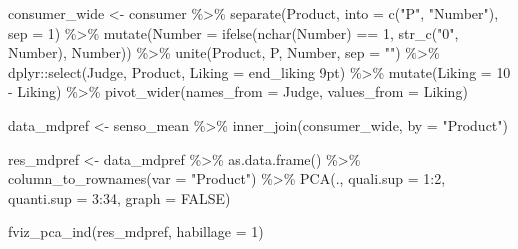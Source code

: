 \documentclass[
]{krantz}
\makeatletter
\newenvironment{Shaded}{\begin{snugshade}}{\end{snugshade}}
\newcommand{\AttributeTok}[1]{\textcolor[rgb]{0.61,0.61,0.61}{#1}}
\newcommand{\ConstantTok}[1]{\textcolor[rgb]{0,0,0}{#1}}
\newcommand{\DecValTok}[1]{\textcolor[rgb]{0.06,0.06,0.06}{#1}}
\newcommand{\FunctionTok}[1]{\textcolor[rgb]{0,0,0}{#1}}
\newcommand{\NormalTok}[1]{#1}
\newcommand{\OtherTok}[1]{\textcolor[rgb]{0.37,0.37,0.37}{#1}}
\newcommand{\SpecialCharTok}[1]{\textcolor[rgb]{0,0,0}{#1}}
\newcommand{\StringTok}[1]{\textcolor[rgb]{0.5,0.5,0.5}{#1}}
\newenvironment{kframe}{%
\medskip{}
\setlength{\fboxsep}{.8em}
 \def\at@end@of@kframe{}%
 \ifinner\ifhmode%
  \def\at@end@of@kframe{\end{minipage}}%
  \begin{minipage}{\columnwidth}%
 \fi\fi%
 \def\FrameCommand##1{\hskip\@totalleftmargin \hskip-\fboxsep
 \colorbox{shadecolor}{##1}\hskip-\fboxsep
     \hskip-\linewidth \hskip-\@totalleftmargin \hskip\columnwidth}%
 \MakeFramed {\advance\hsize-\width
   \@totalleftmargin\z@ \linewidth\hsize
   \@setminipage}}%
 {\par\unskip\endMakeFramed%
 \at@end@of@kframe}
\renewenvironment{Shaded}{\begin{kframe}}{\end{kframe}}
\makeatother
\begin{document}
\begin{Shaded}
\begin{Highlighting}[]
\NormalTok{consumer\_wide }\OtherTok{\textless{}{-}}\NormalTok{ consumer }\SpecialCharTok{\%\textgreater{}\%}
  \FunctionTok{separate}\NormalTok{(Product, }\AttributeTok{into =} \FunctionTok{c}\NormalTok{(}\StringTok{"P"}\NormalTok{, }\StringTok{"Number"}\NormalTok{), }\AttributeTok{sep =} \DecValTok{1}\NormalTok{) }\SpecialCharTok{\%\textgreater{}\%}
  \FunctionTok{mutate}\NormalTok{(}\AttributeTok{Number =} \FunctionTok{ifelse}\NormalTok{(}\FunctionTok{nchar}\NormalTok{(Number) }\SpecialCharTok{==} \DecValTok{1}\NormalTok{, }
                         \FunctionTok{str\_c}\NormalTok{(}\StringTok{"0"}\NormalTok{, Number), Number)) }\SpecialCharTok{\%\textgreater{}\%}
  \FunctionTok{unite}\NormalTok{(Product, P, Number, }\AttributeTok{sep =} \StringTok{""}\NormalTok{) }\SpecialCharTok{\%\textgreater{}\%}
\NormalTok{  dplyr}\SpecialCharTok{::}\FunctionTok{select}\NormalTok{(Judge, Product, }\AttributeTok{Liking =} \StringTok{\textasciigrave{}}\AttributeTok{end\_liking 9pt}\StringTok{\textasciigrave{}}\NormalTok{) }\SpecialCharTok{\%\textgreater{}\%}
  \FunctionTok{mutate}\NormalTok{(}\AttributeTok{Liking =} \DecValTok{10} \SpecialCharTok{{-}}\NormalTok{ Liking) }\SpecialCharTok{\%\textgreater{}\%}
  \FunctionTok{pivot\_wider}\NormalTok{(}\AttributeTok{names\_from =}\NormalTok{ Judge, }\AttributeTok{values\_from =}\NormalTok{ Liking)}

\NormalTok{data\_mdpref }\OtherTok{\textless{}{-}}\NormalTok{ senso\_mean }\SpecialCharTok{\%\textgreater{}\%}
  \FunctionTok{inner\_join}\NormalTok{(consumer\_wide, }\AttributeTok{by =} \StringTok{"Product"}\NormalTok{)}

\NormalTok{res\_mdpref }\OtherTok{\textless{}{-}}\NormalTok{ data\_mdpref }\SpecialCharTok{\%\textgreater{}\%}
  \FunctionTok{as.data.frame}\NormalTok{() }\SpecialCharTok{\%\textgreater{}\%}
  \FunctionTok{column\_to\_rownames}\NormalTok{(}\AttributeTok{var =} \StringTok{"Product"}\NormalTok{) }\SpecialCharTok{\%\textgreater{}\%}
  \FunctionTok{PCA}\NormalTok{(., }\AttributeTok{quali.sup =} \DecValTok{1}\SpecialCharTok{:}\DecValTok{2}\NormalTok{, }\AttributeTok{quanti.sup =} \DecValTok{3}\SpecialCharTok{:}\DecValTok{34}\NormalTok{, }\AttributeTok{graph =} \ConstantTok{FALSE}\NormalTok{)}

\FunctionTok{fviz\_pca\_ind}\NormalTok{(res\_mdpref, }\AttributeTok{habillage =} \DecValTok{1}\NormalTok{)}
\end{Highlighting}
\end{Shaded}
\end{document}
